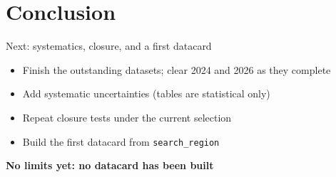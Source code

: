 \documentclass[aspectratio=169,12pt]{beamer}
\newcommand{\takeaway}[1]{\par\vspace{10pt}\centering\small\textbf{#1}\par}
\begin{document}
\section{Conclusion}
\begin{frame}{Next: systematics, closure, and a first datacard}
  \begin{itemize}
    \item Finish the outstanding datasets; clear 2024 and 2026 as they complete
    \item Add systematic uncertainties (tables are statistical only)
    \item Repeat closure tests under the current selection
    \item Build the first datacard from \texttt{search\_region}
  \end{itemize}
  \takeaway{No limits yet: no datacard has been built}
\end{frame}
\end{document}
